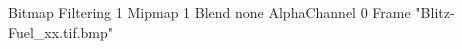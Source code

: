{Bitmap
	{Filtering 1}
	{Mipmap 1}
	{Blend none}
	{AlphaChannel 0}
	{Frame "Blitz-Fuel_xx.tif.bmp"}
}
